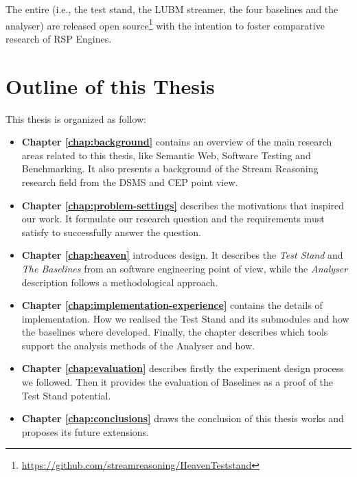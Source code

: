 The entire \name (i.e., the test stand, the LUBM streamer, the four baselines and the analyser) are released open source\footnote{\url{https://github.com/streamreasoning/HeavenTeststand}} with the intention to foster comparative research of RSP Engines.

\section{Outline of this Thesis}\label{sec:thesis-structure-intro}

This thesis is organized as follow:

\begin{itemize}

\item \textbf{Chapter \ref{chap:background}} contains an overview of the main research areas related to this thesis, like Semantic Web, Software Testing and Benchmarking. It also presents a background of the Stream Reasoning research field from the DSMS and CEP point view.
\item \textbf{Chapter \ref{chap:problem-settings}} describes the motivations that inspired our work. It formulate our research question and the requirements \name must satisfy to successfully answer the question.
\item \textbf{Chapter \ref{chap:heaven}} introduces \name design. It describes the \textit{Test Stand} and \textit{The Baselines} from an software engineering point of view, while the \textit{Analyser} description follows a methodological approach.
\item \textbf{Chapter \ref{chap:implementation-experience}} contains the details of \name implementation. How we realised the Test Stand and its submodules and how the baselines where developed. Finally, the chapter describes which tools support the analysis methods of the Analyser and how.
\item \textbf{Chapter \ref{chap:evaluation}} describes firstly the experiment design process we followed. Then it provides the evaluation of \name Baselines as a proof of the Test Stand potential.
\item \textbf{Chapter \ref{chap:conclusions}} draws the conclusion of this thesis works and proposes its future extensions.
\end{itemize}